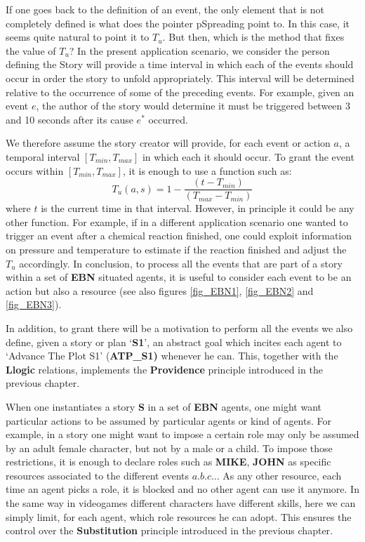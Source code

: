\documentclass[
		twoside,openright,titlepage,numbers=noenddot,manychapters,
		headinclude,%
                footinclude=false,cleardoublepage=empty,
                BCOR=5mm,
		fontsize=11pt, %
                 enabledeprecatedfontcommands]{scrreprt}
\begin{document}
If one goes back to the definition of an event, the only element that is not completely defined  is what does the pointer pSpreading point to. In this case, it seems quite natural to point it to $T_u$. But then, which is the method that fixes the value of $T_u$? In the present application scenario, we consider the person defining the Story will provide a time interval in which each of the events should occur in order the story to unfold appropriately. This interval will be determined relative to the occurrence of some of the preceding events. For example, given an event $e$, the author of the story would determine it must be triggered between 3 and 10 seconds after its cause $e^*$ occurred.


We therefore assume the story creator will provide, for each event or action $a$, a temporal interval $[T_{min}, T_{max}]$ in which each it should occur. To grant the event occurs  within $[T_{min}, T_{max}]$, it is enough to use a function such as: 
\begin{equation*}
T_u(a,s)=1-\frac{(t-T_{min})}{(T_{max}-T_{min})}
\end{equation*}
 where $t$ is the current time in that interval. However, in principle it could be any other function. For example, if in a different application scenario one wanted to trigger an event after a chemical reaction finished, one could exploit information on pressure and temperature to estimate if the reaction finished and adjust the $T_u$ accordingly. 
In conclusion, to process all the events that are part of a story within a set of \textbf{EBN} situated agents, it is useful to consider each event to be an action but also a resource (see also figures \ref{fig_EBN1}, \ref{fig_EBN2} and \ref{fig_EBN3}).



In addition, to grant there will be a motivation to perform all the events we also define, given a story or plan ‘\textbf{S1}’,  an abstract goal which incites each agent to ‘Advance The Plot S1’ (\textbf{ATP\_S1)} whenever he can. This, together with the \textbf{Llogic} relations, implements the \textbf{Providence} principle introduced in the previous chapter.

When one instantiates a story \textbf{S} in a set of \textbf{EBN} agents, one might want particular actions to be assumed by particular agents or kind of agents. For example, in a story one might want to impose a certain role may only be assumed by an adult female character, but not by a male or a child. To impose those restrictions, it is enough to declare roles such as \textbf{MIKE}, \textbf{JOHN} as specific resources associated to the different events $a.b.c…$ As any other resource, each time an agent picks a role, it is blocked and no other agent can use it anymore. In the same way in videogames different characters have different skills, here we can simply limit, for each agent, which role resources he can adopt. This ensures the control over the \textbf{Substitution} principle introduced in the previous chapter.
\end{document}
